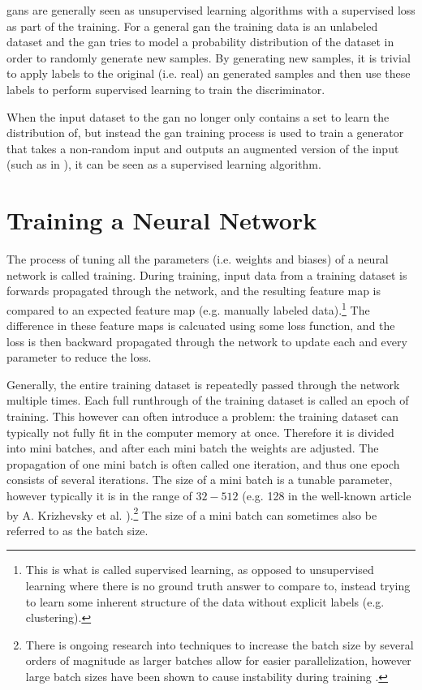 \gls{gan}s are generally seen as unsupervised learning algorithms with a supervised loss as part of the training. For a general \gls{gan} the training data is an unlabeled dataset and the \gls{gan} tries to model a probability distribution of the dataset in order to randomly generate new samples. By generating new samples, it is trivial to apply labels to the original (i.e. real) an generated samples and then use these labels to perform supervised learning to train the discriminator. 

When the input dataset to the \gls{gan} no longer only contains a set to learn the distribution of, but instead the \gls{gan} training process is used to train a generator that takes a non-random input and outputs an augmented version of the input (such as in \cite{liu2020tomogan}), it can be seen as a supervised learning algorithm.

\section{Training a Neural Network}
The process of tuning all the parameters (i.e. weights and biases) of a neural network is called training. During training, input data from a training dataset is forwards propagated through the network, and the resulting feature map is compared to an expected feature map (e.g. manually labeled data).\footnote{This is what is called supervised learning, as opposed to unsupervised learning where there is no ground truth answer to compare to, instead trying to learn some inherent structure of the data without explicit labels (e.g. clustering). } The difference in these feature maps is calcuated using some loss function, and the loss is then backward propagated through the network to update each and every parameter to reduce the loss. 

Generally, the entire training dataset is repeatedly passed through the network multiple times. Each full runthrough of the training dataset is called an epoch of training. This however can often introduce a problem: the training dataset can typically not fully fit in the computer memory at once. Therefore it is divided into mini batches, and after each mini batch the weights are adjusted. The propagation of one mini batch is often called one iteration, and thus one epoch consists of several iterations. The size of a mini batch is a tunable parameter, however typically it is in the range of $32-512$ (e.g. 128 in the well-known article by A. Krizhevsky et al. \cite{alexnet}).\footnote{There is ongoing research into techniques to increase the batch size by several orders of magnitude as larger batches allow for easier parallelization, however large batch sizes have been shown to cause instability during training \cite{you2017large}. } The size of a mini batch can sometimes also be referred to as the batch size. 

